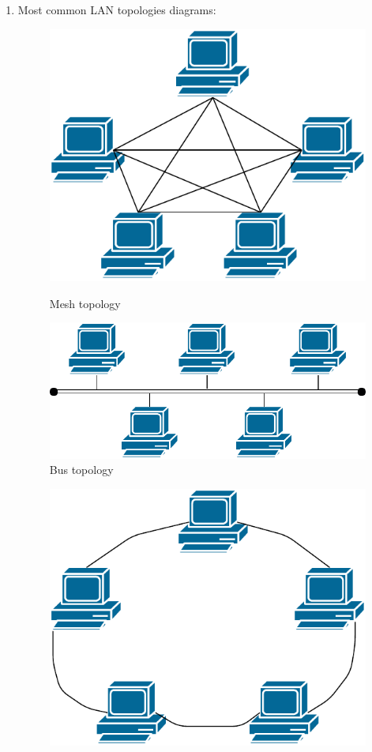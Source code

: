 \documentclass[a4paper, 11pt]{article}
\begin{document}
\begin{enumerate}
		\item %
			Most common LAN topologies diagrams:
			\begin{figure}[H]
				\begin{minipage}{0.5\linewidth}
					\centering
					\includegraphics[width=0.8\linewidth]{inc/mesh_topology.pdf}
					\caption{Mesh topology}
					\label{figure:mesh_topology}
				\end{minipage}
				\begin{minipage}{0.5\linewidth}
					\centering
					\includegraphics[width=0.8\linewidth]{inc/bus_topology.pdf}
					\caption{Bus topology}
					\label{figure:bus_topology}
				\end{minipage}
			\end{figure}
			\begin{figure}[H]
				\begin{minipage}{0.5\linewidth}
					\centering
					\includegraphics[width=0.8\linewidth]{inc/ring_topology.pdf}

\end{minipage}
\end{figure}
\end{enumerate}
\end{document}
